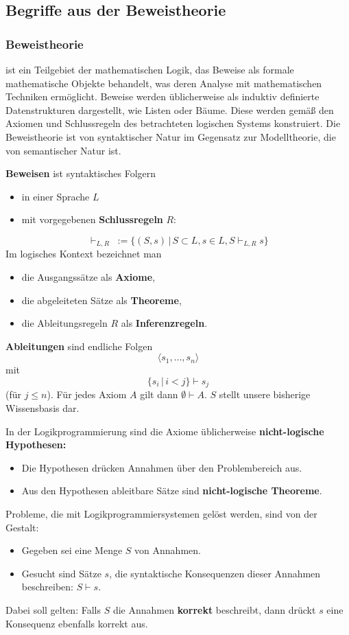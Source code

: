 \documentclass[runningheads,deutsch]{llncs}
\begin{document}
\subsection{Begriffe aus der Beweistheorie}

\subsubsection{Beweistheorie}
ist ein Teilgebiet der mathematischen Logik, das Beweise als formale mathematische Objekte behandelt, was deren Analyse mit mathematischen Techniken ermöglicht. Beweise werden üblicherweise als induktiv definierte Datenstrukturen dargestellt, wie Listen oder Bäume. Diese werden gemäß den Axiomen und Schlussregeln des betrachteten logischen Systems konstruiert. Die Beweistheorie ist von syntaktischer Natur im Gegensatz zur Modelltheorie, die von semantischer Natur ist. 

\textbf{Beweisen} ist syntaktisches Folgern
\begin{itemize}
    \item in einer Sprache $L$
    \item mit vorgegebenen \textbf{Schlussregeln} $R$:
\end{itemize}

\[ \vdash_{L,R}\; := \{(S, s) \, |\, S \subset L, s \in L, S \vdash_{L,R} s\} \]
%
Im logisches Kontext bezeichnet man
\begin{itemize}
    \item die Ausgangssätze als \textbf{Axiome},
    \item die abgeleiteten Sätze als \textbf{Theoreme},
    \item die Ableitungsregeln $R$ als \textbf{Inferenzregeln}.
\end{itemize}
%
\textbf{Ableitungen} sind endliche Folgen
\[ \langle s_1, \dots, s_n\rangle \]
mit
\[ \{s_i \, |\, i < j\} \vdash s_j \]
(für $j \leq n$).
Für jedes Axiom $A$ gilt dann $\emptyset \vdash A$. $S$ stellt unsere bisherige Wissensbasis dar.

\parindent0mm
In der Logikprogrammierung sind die Axiome üblicherweise \textbf{nicht-logische Hypothesen:}
\begin{itemize}
    \item Die Hypothesen drücken Annahmen über den Problembereich aus.
    \item Aus den Hypothesen ableitbare Sätze sind \textbf{nicht-logische Theoreme}.
\end{itemize}
\parindent5mm
%
Probleme, die mit Logikprogrammiersystemen gelöst werden, sind von der Gestalt:
\begin{itemize}
    \item Gegeben sei eine Menge $S$ von Annahmen.
    \item Gesucht sind Sätze $s$, die syntaktische Konsequenzen dieser Annahmen beschreiben: $S \vdash s$.
\end{itemize}
%
Dabei soll gelten: Falls $S$ die Annahmen \textbf{korrekt} beschreibt, dann drückt $s$ eine Konsequenz ebenfalls korrekt aus.
\end{document}
